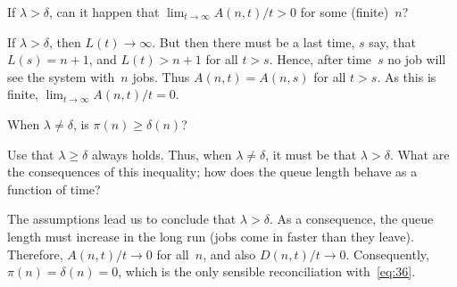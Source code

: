 \documentclass[queueing-book.tex]{subfiles}
\begin{document}
\begin{exercise} \label{ex:38}
If $\lambda>\delta$, can it happen that $ \lim_{t\to\infty} A(n,t)/t > 0$ for some (finite)~$n$?
\begin{solution}
 If $\lambda > \delta$, then $L(t)\to\infty$.
 But then there must be a last time, $s$ say, that $L(s) = n+1$, and $L(t) > n+1$ for all $t>s$.
 Hence, after time~$s$ no job will see the system with~$n$ jobs.
 Thus $A(n,t) = A(n,s)$ for all $t>s$.
As this is  finite, $\lim_{t\to\infty}A(n,t)/t=0$.
\end{solution}
\end{exercise}


\begin{exercise}\label{ex:26}
 When $\lambda\neq \delta$, is $\pi(n)\geq \delta(n)$?
\begin{hint}
 Use that $\lambda \geq \delta$ always holds. Thus, when $\lambda \neq \delta$, it must be that $\lambda > \delta$. What are the consequences of this inequality; how does the queue length behave as a function of time?
\end{hint}
\begin{solution}
 The assumptions lead us to conclude that $\lambda > \delta$. As a consequence, the queue length must increase in the long run (jobs come in faster than they leave). Therefore, $A(n,t)/t \to 0$ for all~$n$, and also $D(n,t)/t\to 0$. Consequently, $\pi(n) = \delta(n) = 0$, which is the only sensible reconciliation with~\cref{eq:36}.
\end{solution}
\end{exercise}
\end{document}
